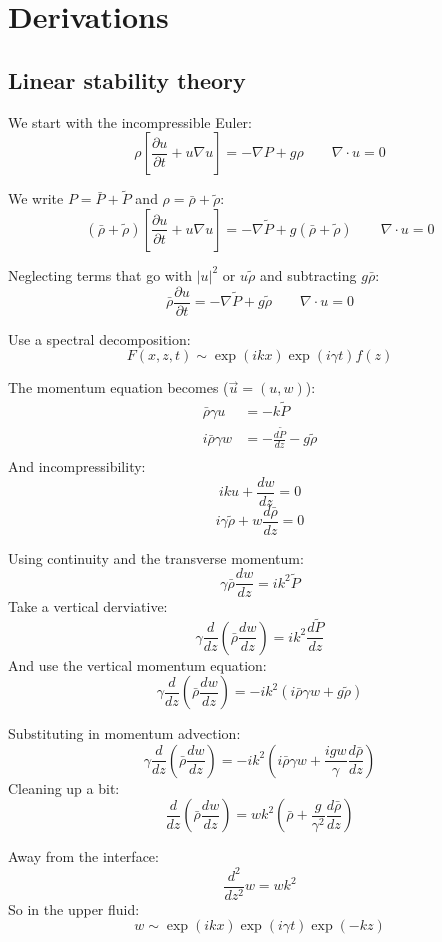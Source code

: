 \chapter{Derivations}

\section{Linear stability theory} 
We start with the incompressible Euler:
$$ \rho \left[ \frac{\partial u}{\partial t} + u \nabla u\right] = -\nabla P + g \rho \qquad \nabla \cdot u = 0$$

We write $P = \bar{P} + \tilde{P}$ and $\rho = \bar\rho + \tilde\rho$:
$$ (\bar\rho +\tilde \rho) \left[ \frac{\partial u}{\partial t} + u \nabla u\right] = -\nabla \tilde{P} + g (\bar\rho+\tilde\rho) \qquad \nabla \cdot u = 0$$

Neglecting terms that go with $|u|^2$ or $u \tilde\rho$ and subtracting $g\bar\rho$:
$$ \bar\rho \frac{\partial u}{\partial t} = -\nabla \tilde{P} + g \tilde\rho \qquad \nabla \cdot u = 0$$

Use a spectral decomposition:
$$ F(x,z,t) \sim \exp(i k x) \exp(i \gamma t) f(z)$$

The momentum equation becomes ($\vec{u} = (u,w)$):
\begin{align}
\bar\rho \gamma u &= - k \tilde{P} \\
i \bar\rho \gamma w &= - \frac{d\tilde{P}}{dz} - g \tilde\rho \\
\end{align}
And incompressibility:
$$ i k u + \frac{dw}{dz} = 0 $$
$$ i \gamma \tilde\rho + w \frac{d\bar\rho}{dz} = 0 $$

Using continuity and the transverse momentum:
$$ \gamma \bar\rho \frac{dw}{dz} = i k^2 \tilde{P}  $$
Take a vertical derviative:
$$ \gamma \frac{d}{dz} \left(\bar\rho \frac{dw}{dz}\right) = i k^2 \frac{d\tilde{P}}{dz}  $$
And use the vertical momentum equation:
$$ \gamma \frac{d}{dz} \left(\bar\rho \frac{dw}{dz}\right) = - i k^2 \left(i \bar\rho \gamma w + g \tilde\rho\right)  $$

Substituting in momentum advection:
$$ \gamma \frac{d}{dz} \left(\bar\rho \frac{dw}{dz}\right) = - i k^2 \left(i \bar\rho \gamma w + \frac{i g w}{\gamma} \frac{d \bar\rho}{dz}\right)  $$
Cleaning up a bit:
$$ \frac{d}{dz} \left(\bar\rho \frac{dw}{dz}\right) = w k^2 \left(\bar\rho   + \frac{ g }{\gamma^2} \frac{d \bar\rho}{dz}\right)  $$

Away from the interface:
$$ \frac{d^2}{dz^2}w  = w k^2  $$
So in the upper fluid:
$$ w \sim \exp(ikx) \exp(i\gamma t) \exp(-kz) $$

